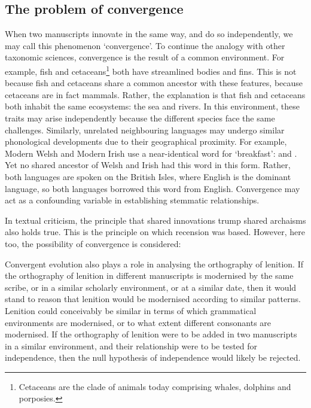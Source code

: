 \subsection{The problem of convergence}
\label{sec:problem-convergence}


When two manuscripts innovate in the same way, and do so independently, we may call this phenomenon `convergence'. To continue the analogy with other taxonomic sciences, convergence is the result of a common environment. For example, fish and cetaceans\footnote{Cetaceans are the clade of animals today comprising whales, dolphins and porposies.} both have streamlined bodies and fins. This is not because fish and cetaceans share a common ancestor with these features, because cetaceans are in fact mammals. Rather, the explanation is that fish and cetaceans both inhabit the same ecosystems: the sea and rivers. In this environment, these traits may arise independently because the different species face the same challenges. Similarly, unrelated neighbouring languages may undergo similar phonological developments due to their geographical proximity. For example, Modern Welsh and Modern Irish use a near-identical word for `breakfast':  and . Yet no shared ancestor of Welsh and Irish had this word in this form. Rather, both languages are spoken on the British Isles, where English is the dominant language, so both languages borrowed this word from English. Convergence may act as a confounding variable in establishing stemmatic relationships.

In textual criticism, the principle that shared innovations trump shared archaisms also holds true. This is the principle on which recension was based. However, here too, the possibility of convergence is considered: 

Convergent evolution also plays a role in analysing the orthography of lenition. If the orthography of lenition in different manuscripts is modernised by the same scribe, or in a similar scholarly environment, or at a similar date, then it would stand to reason that lenition would be modernised according to similar patterns. Lenition could conceivably be similar in terms of which grammatical environments are modernised, or to what extent different consonants are modernised. If the orthography of lenition were to be added in two manuscripts in a similar environment, and their relationship were to be tested for independence, then the null hypothesis of independence would likely be rejected.

